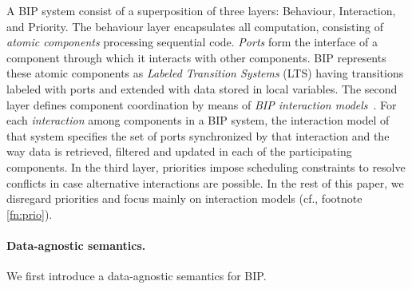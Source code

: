 \documentclass[submission,copyright,creativecommons,hidelinks]{eptcs}
\theoremstyle{plain} \newtheorem{theorem}{Theorem}
\theoremstyle{definition}
\theoremstyle{remark}
\begin{document}
A BIP system consist of a superposition of three layers: Behaviour, Interaction, and Priority.  
The behaviour layer encapsulates all computation, consisting of {\em atomic components} processing sequential code.
{\em Ports} form the interface of a component through which it interacts with other components.  
BIP represents these atomic components as \emph{Labeled Transition Systems} (LTS) having transitions labeled with ports and extended with data stored in local variables. 
The second layer defines component coordination by means of
\emph{BIP interaction models}~\cite{BBJS14}. 
For each \emph{interaction} among components in a BIP system, the interaction model of that system specifies the set of ports synchronized by that interaction and the way data is retrieved, filtered and updated in each of
the participating components.
In the third layer, priorities impose scheduling constraints to
resolve conflicts in case alternative interactions are possible. 
In the rest of this paper, we disregard priorities and focus mainly on
interaction models (cf., footnote \ref{fn:prio}).

\paragraph{Data-agnostic semantics.} 
We first introduce a data-agnostic semantics for BIP.
\end{document}
